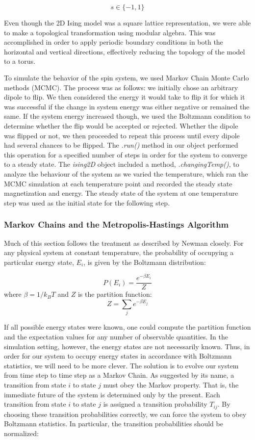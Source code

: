 \documentclass[11pt]{article}
\newcommand\tab[1][.5cm]{\hspace*{#1}}
\begin{document}
\[s \in \{-1,1\}\] 

Even though the 2D Ising model was a square lattice representation, we were able to make a topological transformation using modular algebra. This was accomplished in order to apply periodic boundary conditions in both the horizontal and vertical directions, effectively reducing the topology of the model to a torus.

To simulate the behavior of the spin system, we used Markov Chain Monte Carlo methods (MCMC). The process was as follows: we initially chose an arbitrary dipole to flip. We then considered the energy it would take to flip it for which it was successful if the change in system energy was either negative or remained the same. If the system energy increased though, we used the Boltzmann condition to determine whether the flip would be accepted or rejected. Whether the dipole was flipped or not, we then proceeded to repeat this process until every dipole had several chances to be flipped. The \textit{.run()} method in our object performed this operation for a specified number of steps in order for the system to converge to a steady state. The \textit{ising2D} object included a method, \textit{.changingTemp()}, to analyze the behaviour of the system as we varied the temperature, which ran the MCMC simulation at each temperature point and recorded the steady state magnetization and energy. The steady state of the system at one temperature step was used as the initial state for the following step. 

\subsubsection{Markov Chains and the Metropolis-Hastings Algorithm}
\tab Much of this section follows the treatment as described by Newman\cite{Newman} closely. For any physical system at constant temperature, the probability of occupying a particular energy state, $E_i$, is given by the Boltzmann distribution:

\[P(E_{i}) = \frac{e^{-\beta E_i}}{Z}\]
where $\beta = 1/k_B T$ and $Z$ is the partition function: 
\[Z = \sum_j e^{-\beta E_j}\]

If all possible energy states were known, one could compute the partition function and the expectation values for any number of observable quantities. In the simulation setting, however, the energy states are not necessarily known. Thus, in order for our system to occupy energy states in accordance with Boltzmann statistics, we will need to be more clever. The solution is to evolve our system from time step to time step as a Markov Chain. As suggested by its name, a transition from state $i$ to state $j$ must obey the Markov property. That is, the immediate future of the system is determined only by the present. Each transition from state $i$ to state $j$ is assigned a transition probability $T_{ij}$. By choosing these transition probabilities correctly, we can force the system to obey Boltzmann statistics. In particular, the transition probabilities should be normalized: 
\end{document}
